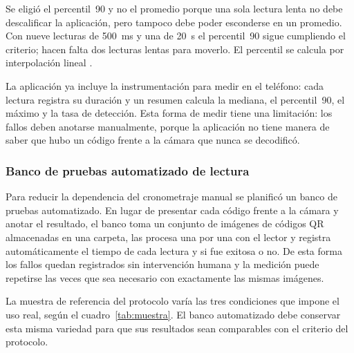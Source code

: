 Se eligió el percentil~90 y no el promedio porque una sola lectura lenta no debe descalificar la aplicación, pero tampoco debe poder esconderse en un promedio. Con nueve lecturas de 500~ms y una de 20~s el percentil~90 sigue cumpliendo el criterio; hacen falta dos lecturas lentas para moverlo. El percentil se calcula por interpolación lineal \cite{hyndman1996sample}.

La aplicación ya incluye la instrumentación para medir en el teléfono: cada lectura registra su duración y un resumen calcula la mediana, el percentil~90, el máximo y la tasa de detección. Esta forma de medir tiene una limitación: los fallos deben anotarse manualmente, porque la aplicación no tiene manera de saber que hubo un código frente a la cámara que nunca se decodificó.

\subsubsection{Banco de pruebas automatizado de lectura}

Para reducir la dependencia del cronometraje manual se planificó un banco de pruebas automatizado. En lugar de presentar cada código frente a la cámara y anotar el resultado, el banco toma un conjunto de imágenes de códigos QR almacenadas en una carpeta, las procesa una por una con el lector y registra automáticamente el tiempo de cada lectura y si fue exitosa o no. De esta forma los fallos quedan registrados sin intervención humana y la medición puede repetirse las veces que sea necesario con exactamente las mismas imágenes.


La muestra de referencia del protocolo varía las tres condiciones que impone el uso real, según el cuadro~\ref{tab:muestra}. El banco automatizado debe conservar esta misma variedad para que sus resultados sean comparables con el criterio del protocolo.

